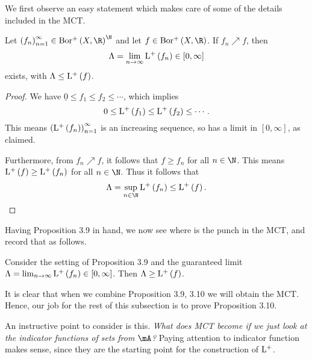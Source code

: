 \documentclass[pmath450]{subfiles}
\begin{document}
    \np We first observe an easy statement which makes care of some of the details included in the MCT.

    \begin{prop}{}
        Let $\left( f_{n} \right)^{\infty}_{n=1}\in\borplus\left( X,\R \right)^{\N}$ and let $f\in\borplus\left( X,\R \right)$. If $f_n\nearrow f$, then
        \begin{equation*}
            \Lambda = \lim_{n\to\infty}\operatorname{L^+}\left( f_n \right)\in\left[ 0,\infty \right]
        \end{equation*}
        exists, with $\Lambda\leq\operatorname{L^+}\left( f \right)$.
    \end{prop}

    \begin{proof}
        We have $\underline{0}\leq f_1\leq f_2\leq\cdots$, which implies
        \begin{equation*}
            0\leq\operatorname{L^+}\left( f_1 \right)\leq\operatorname{L^+}\left( f_2 \right)\leq\cdots.
        \end{equation*}
        This means $\left( \operatorname{L^+}\left( f_n \right) \right)^{\infty}_{n=1}$ is an increasing sequence, so has a limit in $\left[ 0,\infty \right]$, as claimed. 

        Furthermore, from $f_n\nearrow f$, it follows that $f\geq f_n$ for all $n\in\N$. This means $\operatorname{L^+}\left( f \right)\geq\operatorname{L^+}\left( f_n \right)$ for all $n\in\N$. Thus it follows that
        \begin{equation*}
            \Lambda = \sup_{n\in\N}\lplus\left( f_n \right) \leq \lplus\left( f \right).
        \end{equation*}
    \end{proof}

    \np Having Proposition 3.9 in hand, we now see where is the punch in the MCT, and record that as follows.

    \begin{prop}{}
        Consider the setting of Proposition 3.9 and the guaranteed limit $\Lambda=\lim_{n\to\infty}\operatorname{L^+}\left( f_n \right)\in\left[ 0,\infty \right]$. Then $\Lambda\geq\operatorname{L^+}\left( f \right)$.
    \end{prop}

    \placeqed[Postponed]

    \np It is clear that when we combine Proposition 3.9, 3.10 we will obtain the MCT. Hence, our job for the rest of this subsection is to prove Proposition 3.10.

    \np An instructive point to consider is this. \textit{What does MCT become if we just look at the indicator functions of sets from $\mA$?} Paying attention to indicator function makes sense, since they are the starting point for the construction of $\operatorname{L^+}$.
\end{document}
